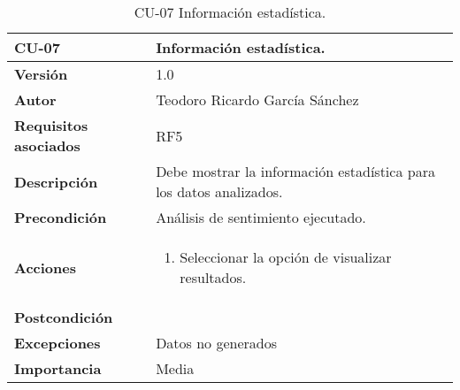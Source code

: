\begin{table}[p]
	\centering
	\begin{tabularx}{\linewidth}{ p{} p{} }
		\toprule
		\textbf{CU-07}    & \textbf{Información estadística.}\\
		\toprule
		\textbf{Versión}              & 1.0    \\
		\textbf{Autor}                & Teodoro Ricardo García Sánchez \\
		\textbf{Requisitos asociados} & RF5 \\
		\textbf{Descripción}          & Debe mostrar la información estadística para los datos analizados.  \\
		\textbf{Precondición}         & Análisis de sentimiento ejecutado. \\
		\textbf{Acciones}             &
		\begin{enumerate}
			\def\labelenumi{\arabic{enumi}.}
			\tightlist
			\item Seleccionar la opción de visualizar resultados.
		\end{enumerate}\\
		\textbf{Postcondición}        &  \\
		\textbf{Excepciones}          & Datos no generados \\
		\textbf{Importancia}          & Media \\
		\bottomrule
	\end{tabularx}
	\caption{CU-07 Información estadística.}
\end{table}

